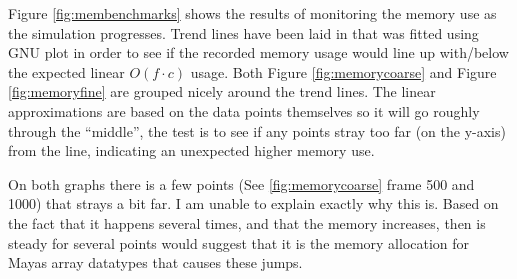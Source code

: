 Figure \ref{fig:membenchmarks} shows the results of monitoring the memory use
as the simulation progresses. Trend lines have been laid in that was fitted
using GNU plot in order to see if the recorded memory usage would line up
with/below the expected linear $O(f\cdot c)$ usage. Both Figure
\ref{fig:memorycoarse} and Figure \ref{fig:memoryfine} are grouped nicely around
the trend lines. The linear approximations are based on the data points
themselves so it will go roughly through the ``middle'', the test is to see if
any points stray too far (on the y-axis) from the line, indicating an unexpected
higher memory use.

On both graphs there is a few points (See \ref{fig:memorycoarse} frame 500 and
1000) that strays a bit far. I am unable to explain exactly why this is. Based
on the fact that it happens several times, and that the memory increases,
then is steady for several points would suggest that it is the memory allocation
for Mayas array datatypes that causes these jumps.

